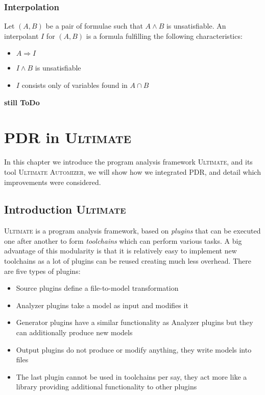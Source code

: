 \documentclass[11pt, a4paper, BCOR=10mm, ngerman]{scrbook}
\begin{document}
\subsection{Interpolation}
Let $(A, B)$ be a pair of formulae such that $A \land B$ is unsatisfiable. An interpolant $I$ for $(A, B)$ is a formula fulfilling the following characteristics:
\begin{itemize}
\item $A \Rightarrow I$
\item $I \land B$ is unsatisfiable
\item $I$ consists only of variables found in $A \cap B$
\end{itemize}

\textbf{still ToDo}

\pagebreak


\chapter{PDR in \textsc{Ultimate}}
In this chapter we introduce the program analysis framework \textsc{Ultimate}, and its tool \textsc{Ultimate Automizer}, we will show how we integrated PDR, and detail which improvements were considered.
\section{Introduction \textsc{Ultimate}}
\textsc{Ultimate} is a program analysis framework, based on \textsl{plugins} that can be executed one after another to form \textsl{toolchains} which can perform various tasks. A big advantage of this modularity is that it is relatively easy to implement new toolchains as a lot of plugins can be reused creating much less overhead. There are five types of plugins: 
\begin{itemize}
\item Source plugins define a file-to-model transformation

\item  Analyzer plugins take a model as input and modifies it

\item Generator plugins have a similar functionality as Analyzer plugins but they can additionally produce new models

\item Output plugins do not produce or modify anything, they write models into files

\item The last plugin cannot be used in toolchains per say, they act more like a library providing additional functionality to other plugins

\end{itemize}
\end{document}
